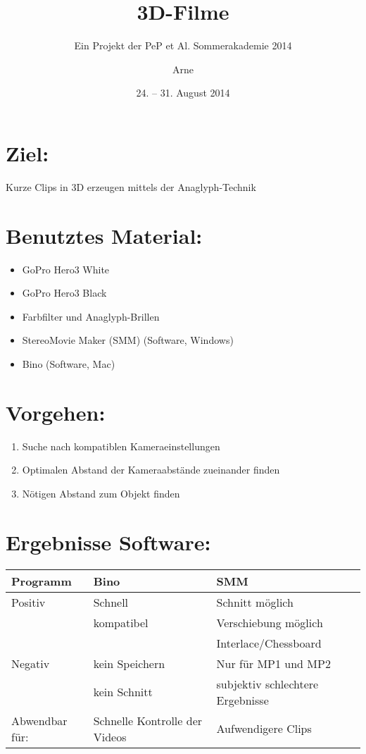 

\title{3D-Filme}
\subtitle{Ein Projekt der PeP et Al. Sommerakademie 2014}
\date{24. -- 31. August 2014}

\author{Arne}


\maketitle
\tableofcontents

\section{Ziel:}
Kurze Clips in 3D erzeugen mittels der Anaglyph-Technik

\section{Benutztes Material:} 
\begin{itemize}
	\item GoPro Hero3 White
	\item GoPro Hero3 Black
	\item Farbfilter und Anaglyph-Brillen
	\item StereoMovie Maker (SMM) (Software, Windows)
	\item Bino (Software, Mac)
\end{itemize}

\section{Vorgehen:} 
\begin{enumerate}
	\item Suche nach kompatiblen Kameraeinstellungen
	\item Optimalen Abstand der Kameraabstände zueinander finden
	\item Nötigen Abstand zum Objekt finden
\end{enumerate}

\section{Ergebnisse Software:}

\begin{tabular}{l l l}
  \toprule
  Programm & Bino & SMM\\
  \midrule 
  Positiv & Schnell & Schnitt möglich\\
          & kompatibel & Verschiebung möglich\\
          & & Interlace/Chessboard\\
  Negativ & kein Speichern & Nur für MP1 und MP2\\
          & kein Schnitt & subjektiv schlechtere Ergebnisse\\
  Abwendbar für: & Schnelle Kontrolle der Videos & Aufwendigere Clips\\
  \bottomrule
\end{tabular}

